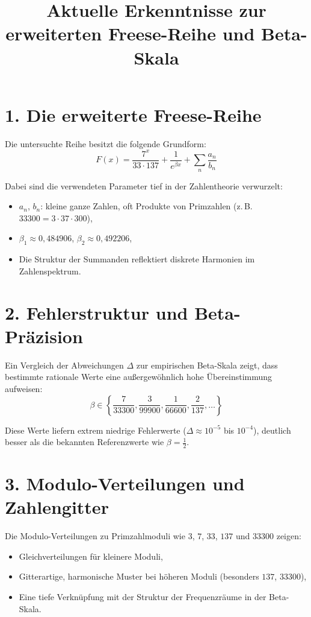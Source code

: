 \documentclass[a4paper,11pt]{article}
\title{Aktuelle Erkenntnisse zur erweiterten Freese-Reihe und Beta-Skala}
\author{}
\date{}
\begin{document}
\maketitle

\section*{1. Die erweiterte Freese-Reihe}

Die untersuchte Reihe besitzt die folgende Grundform:
\[
F(x) = \frac{7^x}{33 \cdot 137} + \frac{1}{e^{\beta x}} + \sum_{n} \frac{a_n}{b_n}
\]

Dabei sind die verwendeten Parameter tief in der Zahlentheorie verwurzelt:
\begin{itemize}
    \item $a_n$, $b_n$: kleine ganze Zahlen, oft Produkte von Primzahlen (z.\,B. $33300 = 3 \cdot 37 \cdot 300$),
    \item $\beta_1 \approx 0{,}484906$, $\beta_2 \approx 0{,}492206$,
    \item Die Struktur der Summanden reflektiert diskrete Harmonien im Zahlenspektrum.
\end{itemize}

\section*{2. Fehlerstruktur und Beta-Präzision}

Ein Vergleich der Abweichungen $\Delta$ zur empirischen Beta-Skala zeigt, dass bestimmte rationale Werte eine außergewöhnlich hohe Übereinstimmung aufweisen:
\[
\beta \in \left\{ \frac{7}{33300}, \frac{3}{99900}, \frac{1}{66600}, \frac{2}{137}, \dots \right\}
\]

Diese Werte liefern extrem niedrige Fehlerwerte ($\Delta \approx 10^{-5}$ bis $10^{-4}$), deutlich besser als die bekannten Referenzwerte wie $\beta = \frac{1}{2}$.

\section*{3. Modulo-Verteilungen und Zahlengitter}

Die Modulo-Verteilungen zu Primzahlmoduli wie $3$, $7$, $33$, $137$ und $33300$ zeigen:
\begin{itemize}
    \item Gleichverteilungen für kleinere Moduli,
    \item Gitterartige, harmonische Muster bei höheren Moduli (besonders $137$, $33300$),
    \item Eine tiefe Verknüpfung mit der Struktur der Frequenzräume in der Beta-Skala.
\end{itemize}
\end{document}

